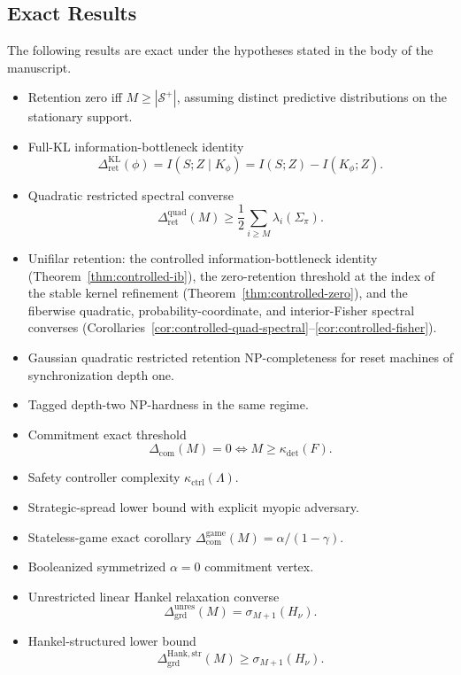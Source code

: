 \documentclass[12pt]{article}
\theoremstyle{definition}
\newcommand{\RetKL}{\Delta_{\mathrm{ret}}^{\mathrm{KL}}}
\newcommand{\RetQuad}{\Delta_{\mathrm{ret}}^{\mathrm{quad}}}
\newcommand{\Dunres}{\Delta_{\mathrm{grd}}^{\mathrm{unres}}}
\newcommand{\DHankstr}{\Delta_{\mathrm{grd}}^{\mathrm{Hank,str}}}
\newcommand{\Com}{\Delta_{\mathrm{com}}}
\newcommand{\ComGame}{\Delta_{\mathrm{com}}^{\mathrm{game}}}
\newcommand{\Splus}{\mathcal S^{+}}
\begin{document}
\subsection{Exact Results}
\label{subsec:exact-results}

The following results are exact under the hypotheses stated in the body of the
manuscript.

\begin{itemize}[leftmargin=1.6em]
\item Retention zero iff $M\ge|\Splus|$, assuming distinct predictive
distributions on the stationary support.
\item Full-KL information-bottleneck identity
\[
\RetKL(\phi)=I(S;Z\mid K_\phi)
=
I(S;Z)-I(K_\phi;Z).
\]
\item Quadratic restricted spectral converse
\[
\RetQuad(M)
\ge
\frac12
\sum_{i\ge M}
\lambda_i(\Sigma_\pi).
\]
\item Unifilar retention: the controlled information-bottleneck identity
(Theorem~\ref{thm:controlled-ib}), the zero-retention threshold at the index of
the stable kernel refinement (Theorem~\ref{thm:controlled-zero}), and the
fiberwise quadratic, probability-coordinate, and interior-Fisher spectral
converses
(Corollaries~\ref{cor:controlled-quad-spectral}--\ref{cor:controlled-fisher}).
\item Gaussian quadratic restricted retention NP-completeness for reset
machines of synchronization depth one.
\item Tagged depth-two NP-hardness in the same regime.
\item Commitment exact threshold
\[
\Com(M)=0
\iff
M\ge\kappa_{\det}(F).
\]
\item Safety controller complexity $\kappa_{\mathrm{ctrl}}(\Lambda)$.
\item Strategic-spread lower bound with explicit myopic adversary.
\item Stateless-game exact corollary $\ComGame(M)=\alpha/(1-\gamma)$.
\item Booleanized symmetrized $\alpha=0$ commitment vertex.
\item Unrestricted linear Hankel relaxation converse
\[
\Dunres(M)
=
\sigma_{M+1}(H_\nu).
\]
\item Hankel-structured lower bound
\[
\DHankstr(M)\ge\sigma_{M+1}(H_\nu).
\]


\end{itemize}
\end{document}
